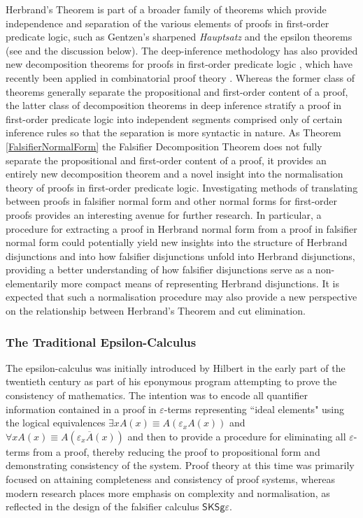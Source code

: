 \documentclass[10pt]{article}
\theoremstyle{definition}\newtheorem{remark}[theorem]{Remark}
\theoremstyle{definition}\newtheorem{example}[theorem]{Example}
\theoremstyle{definition}\newtheorem{definition}[theorem]{Definition}
\newcommand{\FalsifierCalculus}{{\mathsf{SKSg\varepsilon}}}
\begin{document}
	Herbrand's Theorem is part of a broader family of theorems which provide independence and separation of the various elements of proofs in first-order predicate logic, such as Gentzen's sharpened \textit{Hauptsatz} \cite{GentzenInvestigations} and the epsilon theorems (see \cite{MoserZachEpsilonCalculusAndHerbrand} and the discussion below). The deep-inference methodology has also provided new decomposition theorems for proofs in first-order predicate logic \cite{KaiThesis, HughesCombinatorialProofsDecomposition}, which have recently been applied in combinatorial proof theory \cite{HughesCombinatorialProofsDecomposition}. Whereas the former class of theorems generally separate the propositional and first-order content of a proof, the latter class of decomposition theorems in deep inference stratify a proof in first-order predicate logic into independent segments comprised only of certain inference rules so that the separation is more syntactic in nature. As Theorem \ref{FalsifierNormalForm} the Falsifier Decomposition Theorem does not fully separate the propositional and first-order content of a proof, it provides an entirely new decomposition theorem and a novel insight into the normalisation theory of proofs in first-order predicate logic. Investigating methods of translating between proofs in falsifier normal form and other normal forms for first-order proofs provides an interesting avenue for further research. In particular, a procedure for extracting a proof in Herbrand normal form from a proof in falsifier normal form could potentially yield new insights into the structure of Herbrand disjunctions and into how falsifier disjunctions unfold into Herbrand disjunctions, providing a better understanding of how falsifier disjunctions serve as a non-elementarily more compact means of representing Herbrand disjunctions. It is expected that such a normalisation procedure may also provide a new perspective on the relationship between Herbrand's Theorem and cut elimination.
	
	\subsubsection*{The Traditional Epsilon-Calculus}
	
	The epsilon-calculus was initially introduced by Hilbert \cite{HilbertFoundations} in the early part of the twentieth century as part of his eponymous program attempting to prove the consistency of mathematics. The intention was to encode all quantifier information contained in a proof in $\varepsilon$-terms representing ``ideal elements" using the logical equivalences $\exists x A(x) \equiv A(\varepsilon_x A(x))$ and $\forall x A(x) \equiv A(\varepsilon_x \overline{A}(x))$ and then to provide a procedure for eliminating all $\varepsilon$-terms from a proof, thereby reducing the proof to propositional form and demonstrating consistency of the system. Proof theory at this time was primarily focused on attaining completeness and consistency of proof systems, whereas modern research places more emphasis on complexity and normalisation, as reflected in the design of the falsifier calculus $\FalsifierCalculus$.
	
\end{document}
